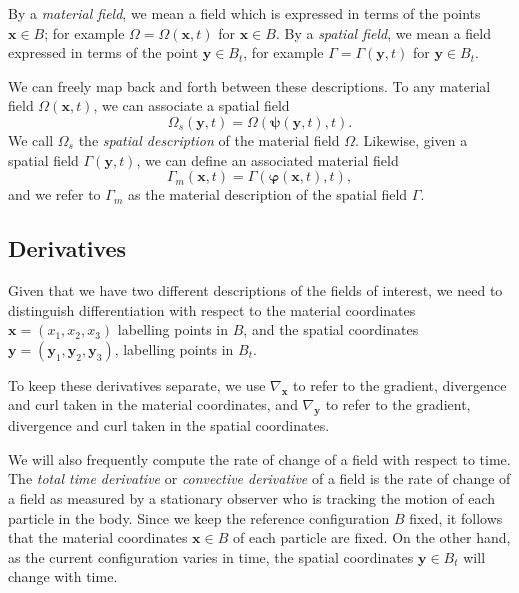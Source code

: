 \documentclass[
  letterpaper,
  DIV=11,
  numbers=noendperiod]{scrreprt}
\theoremstyle{plain}
\theoremstyle{remark}
\begin{document}
By a \emph{material field}, we mean a field which is expressed in terms
of the points \({\boldsymbol{x}}\in B\); for example
\(\Omega=\Omega({\boldsymbol{x}},t)\) for \({\boldsymbol{x}}\in B\). By
a \emph{spatial field}, we mean a field expressed in terms of the point
\({\boldsymbol{y}}\in B_t\), for example
\(\Gamma=\Gamma({\boldsymbol{y}},t)\) for \({\boldsymbol{y}}\in B_t\).

We can freely map back and forth between these descriptions. To any
material field \(\Omega({\boldsymbol{x}},t)\), we can associate a
spatial field
\[\Omega_s({\boldsymbol{y}},t) = \Omega({\boldsymbol{\psi}}({\boldsymbol{y}},t),t).\]
We call \(\Omega_s\) the \emph{spatial description} of the material
field \(\Omega\). Likewise, given a spatial field
\(\Gamma({\boldsymbol{y}},t)\), we can define an associated material
field
\[\Gamma_m({\boldsymbol{x}},t) = \Gamma({\boldsymbol{\varphi}}({\boldsymbol{x}},t),t),\]
and we refer to \(\Gamma_m\) as the material description of the spatial
field \(\Gamma\).

\subsection{Derivatives}\label{derivatives}

Given that we have two different descriptions of the fields of interest,
we need to distinguish differentiation with respect to the material
coordinates \({\boldsymbol{x}}= (x_1,x_2,x_3)\) labelling points in
\(B\), and the spatial coordinates
\({\boldsymbol{y}}=({\boldsymbol{y}}_1,{\boldsymbol{y}}_2,{\boldsymbol{y}}_3)\),
labelling points in \(B_t\).

To keep these derivatives separate, we use \(\nabla_{\boldsymbol{x}}\)
to refer to the gradient, divergence and curl taken in the material
coordinates, and \(\nabla_{\boldsymbol{y}}\) to refer to the gradient,
divergence and curl taken in the spatial coordinates.

We will also frequently compute the rate of change of a field with
respect to time. The \emph{total time derivative} or \emph{convective
derivative} of a field is the rate of change of a field as measured by a
stationary observer who is tracking the motion of each particle in the
body. Since we keep the reference configuration \(B\) fixed, it follows
that the material coordinates \({\boldsymbol{x}}\in B\) of each particle
are fixed. On the other hand, as the current configuration varies in
time, the spatial coordinates \({\boldsymbol{y}}\in B_t\) will change
with time.
\end{document}
